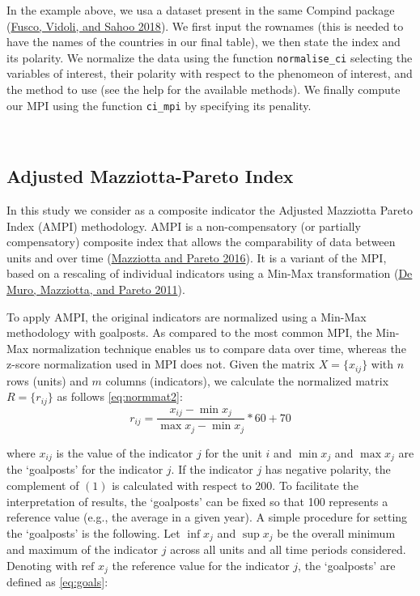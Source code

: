 \documentclass[
]{svmono}
\begin{document}
In the example above, we usa a dataset present in the same Compind
package (\protect\hyperlink{ref-compind}{Fusco, Vidoli, and Sahoo 2018}). We first input the rownames (this is needed to have
the names of the countries in our final table), we then state the index
and its polarity. We normalize the data using the function
\texttt{normalise\_ci} selecting the variables of interest, their polarity with
respect to the phenomeon of interest, and the method to use (see the
help for the available methods). We finally compute our MPI using the
function \texttt{ci\_mpi} by specifying its penality.

~

\hypertarget{adjusted-mazziotta-pareto-index}{%
\subsection{Adjusted Mazziotta-Pareto Index}\label{adjusted-mazziotta-pareto-index}}

In this study we consider as a composite indicator the Adjusted
Mazziotta Pareto Index (AMPI) methodology. AMPI is a non-compensatory
(or partially compensatory) composite index that allows the
comparability of data between units and over time
(\protect\hyperlink{ref-mazziotta2016generalized}{Mazziotta and Pareto 2016}). It is a variant of the MPI, based on a
rescaling of individual indicators using a Min-Max transformation
(\protect\hyperlink{ref-de2011composite}{De Muro, Mazziotta, and Pareto 2011}).

To apply AMPI, the original indicators are normalized using a Min-Max
methodology with goalposts. As compared to the most common MPI, the
Min-Max normalization technique enables us to compare data over time,
whereas the z-score normalization used in MPI does not. Given the matrix
\(X=\{x_{ij}\}\) with \(n\) rows (units) and \(m\) columns (indicators), we
calculate the normalized matrix \(R=\{r_{ij}\}\) as follows \eqref{eq:normmat2}:
\begin{equation}
r_{ij}=\frac{x_{ij} -\min x_j}{\max x_j - \min x_j} *60+70
\label{eq:normmat2}
\end{equation}

where \(x_{ij}\) is the value of the indicator \(j\) for the unit \(i\) and
\(\min x_j\) and \(\max x_j\) are the `goalposts' for the indicator \(j\). If
the indicator \(j\) has negative polarity, the complement of \((1)\) is
calculated with respect to \(200\). To facilitate the interpretation of
results, the `goalposts' can be fixed so that 100 represents a reference
value (e.g., the average in a given year). A simple procedure for
setting the `goalposts' is the following. Let \(\inf x_j\) and \(\sup x_j\)
be the overall minimum and maximum of the indicator \(j\) across all units
and all time periods considered. Denoting with \(\text{ref } x_j\) the
reference value for the indicator \(j\), the `goalposts' are defined as \eqref{eq:goals}:
\end{document}
